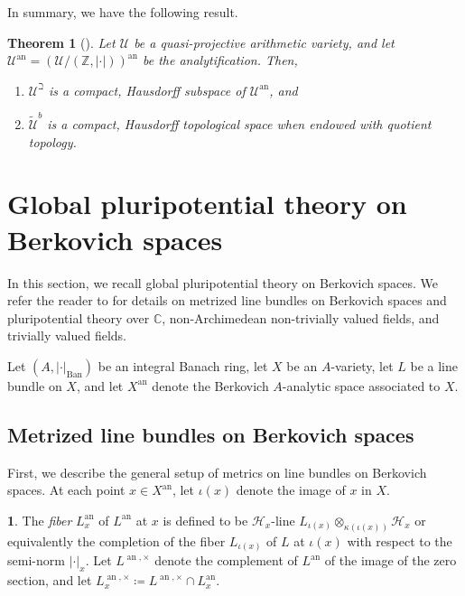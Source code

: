 \documentclass[11pt,reqno]{amsart}
\newcommand{\mZ}{\mathbb{Z}}
\newcommand{\mC}{\mathbb{C}}
\newcommand{\cU}{\mathcal{U}}
\newcommand{\wt}[1]{\widetilde{#1}}
\newcommand{\sH}{{\mathscr H}}
\theoremstyle{theorem}
\numberwithin{equation}{subsection}
\newtheorem{theorem}[subsubsection]{Theorem}
\numberwithin{equation}{subsection}
\theoremstyle{definition}
\newtheorem{definition}[subsubsection]{\text{Definition}}
\theoremstyle{remark}
\numberwithin{equation}{subsubsection} \numberwithin{figure}{section}
\DeclareMathOperator{\an}{an}
\newcommand{\cdef}[1]{\textsf{\textit{#1}}}
\DeclareMathOperator{\Ban}{Ban}
\begin{document}
In summary, we have the following result. 

\begin{theorem}[]
Let $\cU$ be a quasi-projective arithmetic variety, and let $\cU^{\an} = (\cU/(\mZ,|\cdot|))^{\an}$ be the analytification. 
Then, 
\begin{enumerate}
\item $\cU^{\beth}$ is a compact, Hausdorff subspace of $\cU^{\an}$, and 
\item $\wt{\cU}^b$ is a compact, Hausdorff topological space when endowed with quotient topology. 
\end{enumerate}
\end{theorem}



\section{Global pluripotential theory on Berkovich spaces}
\label{sec:globalpluripotential}
In this section, we recall global pluripotential theory on Berkovich spaces. 
We refer the reader to \cite{BoucksomEriksson:SpaceNorms, BoucksomJonsson:SingularPSH, PilleSchneider:Global} for details on metrized line bundles on Berkovich spaces and pluripotential theory over $\mC$, non-Archimedean non-trivially valued fields, and trivially valued fields. 

Let $(A,|\cdot|_{\Ban})$ be an integral Banach ring, let $X$ be an $A$-variety, let $L$ be a line bundle on $X$, and let $X^{\an}$ denote the Berkovich $A$-analytic space associated to $X$. 


\subsection{Metrized line bundles on Berkovich spaces}
\label{subsec:metrizedlinebundles}
First, we describe the general setup of metrics on line bundles on Berkovich spaces. 
At each point $x\in X^{\an}$, let $\iota(x)$ denote the image of $x$ in $X$. 


\begin{definition}
The \cdef{fiber} $L^{\an}_x$ of $L^{\an}$ at $x$ is defined to be $\sH_x$-line $L_{\iota(x)} \otimes_{\kappa(\iota(x))} \sH_x$ or equivalently the completion of the fiber $L_{\iota(x)}$ of $L$ at $\iota(x)$ with respect to the semi-norm $|\cdot|_x$. 
Let $L^{\an,\times}$ denote the complement of $L^{\an}$ of the image of the zero section, and let $L^{\an,\times}_x \coloneqq L^{\an,\times} \cap L^{\an}_x$. 
\end{definition}
\end{document}
